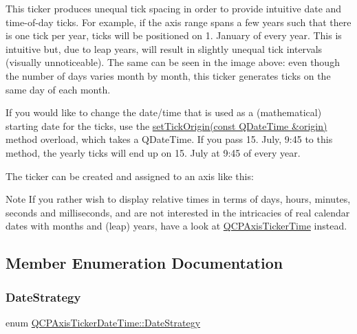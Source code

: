 This ticker produces unequal tick spacing in order to provide intuitive date and time-\/of-\/day ticks. For example, if the axis range spans a few years such that there is one tick per year, ticks will be positioned on 1. January of every year. This is intuitive but, due to leap years, will result in slightly unequal tick intervals (visually unnoticeable). The same can be seen in the image above\+: even though the number of days varies month by month, this ticker generates ticks on the same day of each month.

If you would like to change the date/time that is used as a (mathematical) starting date for the ticks, use the \hyperlink{class_q_c_p_axis_ticker_date_time_a2ea905872b8171847a49a5e093fb0c48}{set\+Tick\+Origin(const Q\+Date\+Time \&origin)} method overload, which takes a Q\+Date\+Time. If you pass 15. July, 9\+:45 to this method, the yearly ticks will end up on 15. July at 9\+:45 of every year.

The ticker can be created and assigned to an axis like this\+: 
\begin{DoxyCodeInclude}
\end{DoxyCodeInclude}
 \begin{DoxyNote}{Note}
If you rather wish to display relative times in terms of days, hours, minutes, seconds and milliseconds, and are not interested in the intricacies of real calendar dates with months and (leap) years, have a look at \hyperlink{class_q_c_p_axis_ticker_time}{Q\+C\+P\+Axis\+Ticker\+Time} instead. 
\end{DoxyNote}


\subsection{Member Enumeration Documentation}
\mbox{\label{class_q_c_p_axis_ticker_date_time_af2c7c60821a6234ca7a172f42ef7f1d8}} 
\subsubsection{\texorpdfstring{Date\+Strategy}{DateStrategy}}
{\footnotesize\ttfamily enum \hyperlink{class_q_c_p_axis_ticker_date_time_af2c7c60821a6234ca7a172f42ef7f1d8}{Q\+C\+P\+Axis\+Ticker\+Date\+Time\+::\+Date\+Strategy}\hspace{0.3cm}{\ttfamily [protected]}}

